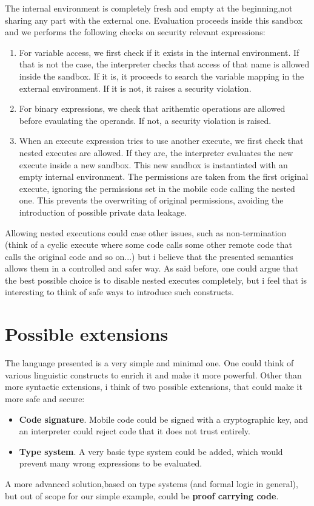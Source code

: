 \documentclass{article}
\begin{document}
 The internal environment is completely fresh and empty at the beginning,not sharing any part with the external one. 
 Evaluation proceeds inside this sandbox and we performs the following checks on security relevant expressions:
 \begin{enumerate}
     \item For variable access, we first check if it exists in the internal environment. If that is not the case, 
     the interpreter checks that access of that name is allowed inside the sandbox. If it is, it proceeds to search the variable mapping in the external environment. If it is not, it raises 
     a security violation.
     \item For binary expressions, we check that arithemtic operations are allowed before evaulating the operands. If not, a security violation is raised.
     \item When an execute expression tries to use another execute, we first check that nested executes are allowed. If they are, the interpreter 
     evaluates the new execute inside a new sandbox. This new sandbox is instantiated with an empty internal environment. The permissions are taken from the first original execute, ignoring the permissions set in the mobile code calling the nested one. 
     This prevents the overwriting of original permissions, avoiding the introduction of possible private data leakage.
 \end{enumerate}

 Allowing nested executions could case other issues, such as non-termination (think of a cyclic execute where some code calls some other remote code that calls the original code  and so on...) but i believe that the presented semantics allows them in a controlled and safer way. 
 As said before, one could argue that the best possible choice is to disable nested executes completely, but i feel that is interesting to think of safe ways to introduce such constructs.

 \section{Possible extensions}

 The language presented is a very simple and minimal one. One could think of various linguistic constructs to enrich it and make it more powerful. 
 Other than more syntactic extensions, i think of two possible extensions, that could make it more safe and secure: 
 \begin{itemize}
     \item \textbf{Code signature}. Mobile code could be signed with a cryptographic key, and an interpreter could reject code that it does not trust entirely. 
     \item \textbf{Type system}. A very basic type system could be added, which  would prevent many wrong expressions to be evaluated. 

 \end{itemize}
 A more advanced solution,based on type systems (and formal logic in general), but out of scope for our simple example,  could be \textbf{proof carrying code}\cite{necula1997proof}.
\end{document}
